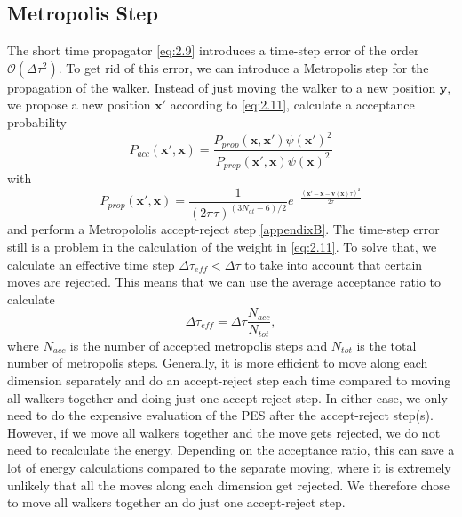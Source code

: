 \documentclass [12pt]{report}
\begin{document}
\subsection{Metropolis Step} \label{metro}
The short time propagator \eqref{eq:2.9} introduces a time-step error of the order $\mathcal{O}(\Delta \tau^2)$. To get rid of this error, we can introduce a Metropolis step for the propagation of the walker. Instead of just moving the walker to a new position $\bm{y}$, we propose a new position $\bm{x}'$ according to \eqref{eq:2.11}, calculate a acceptance probability 
\begin{equation}\label{Pacc}
P_{acc}(\bm{x}',\bm{x}) = \frac{P_{prop}(\bm{x},\bm{x}') \psi(\bm{x}')^2}{P_{prop}(\bm{x}',\bm{x}) \psi(\bm{x})^2}
\end{equation}
with
\begin{equation}\label{Pprop}
P_{prop}(\bm{x}',\bm{x}) = \frac{1}{(2\pi\tau)^{(3N_{at}-6)/2}} e^{-\frac{(\bm{x}'-\bm{x}-\bm{v}(\bm{x})\tau)^2}{2\tau}}
\end{equation}
and perform a Metropololis accept-reject step \ref{appendixB}.
The time-step error still is a problem in the calculation of the weight in \eqref{eq:2.11}. To solve that, we calculate an effective time step $\Delta \tau_{eff} < \Delta \tau$ to take into account that certain moves are rejected. This means that we can use the average acceptance ratio to calculate
\begin{equation}\label{tau_eff}
\Delta \tau_{eff} = \Delta \tau \frac{N_{acc}}{N_{tot}},
\end{equation}
where $N_{acc}$ is the number of accepted metropolis steps and $N_{tot}$ is the total number of metropolis steps.
Generally, it is more efficient to move along each dimension separately and do an accept-reject step each time compared to moving all walkers together and doing just one accept-reject step. In either case, we only need to do the expensive evaluation of the PES after the accept-reject step(s). However, if we move all walkers together and the move gets rejected, we do not need to recalculate the energy. Depending on the acceptance ratio, this can save a lot of energy calculations compared to the separate moving, where it is extremely unlikely that all the moves along each dimension get rejected. We therefore chose to move all walkers together an do just one accept-reject step.
\end{document}
